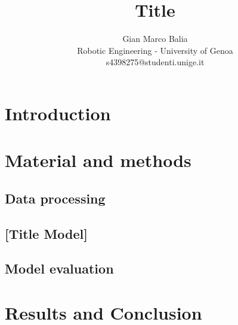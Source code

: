 \documentclass[9pt,technote]{IEEEtran}
\title{Title}
\author{
	Gian Marco Balia\\
	Robotic Engineering - University of Genoa\\
	s4398275@studenti.unige.it
}
\begin{document}
\maketitle

\begin{abstract}

\end{abstract}
\begin{IEEEkeywords}

\end{IEEEkeywords}

\section{Introduction}

\section{Material and methods}

\subsection{Data processing}

\subsection{[Title Model]}


\subsection{Model evaluation}


\section{Results and Conclusion}



\end{document}
